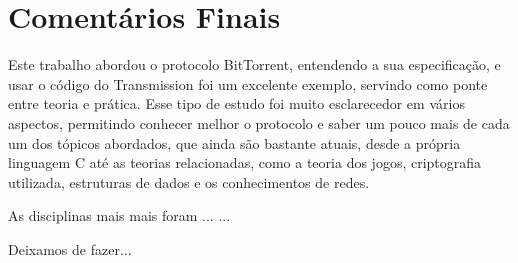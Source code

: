 
\chapter{Comentários Finais}

Este trabalho abordou o protocolo BitTorrent, entendendo a sua especificação, e usar o
código do Transmission foi um excelente exemplo, servindo como ponte entre teoria e
prática. Esse tipo de estudo foi muito esclarecedor em vários aspectos, permitindo
conhecer melhor o protocolo e saber um pouco mais de cada um dos tópicos abordados, que
ainda são bastante atuais, desde a própria linguagem C até as teorias relacionadas,
como a teoria dos jogos, criptografia utilizada, estruturas de dados e os conhecimentos
de redes.

As disciplinas mais mais foram ...
...

Deixamos de fazer...

\afterpage{\clearpage}